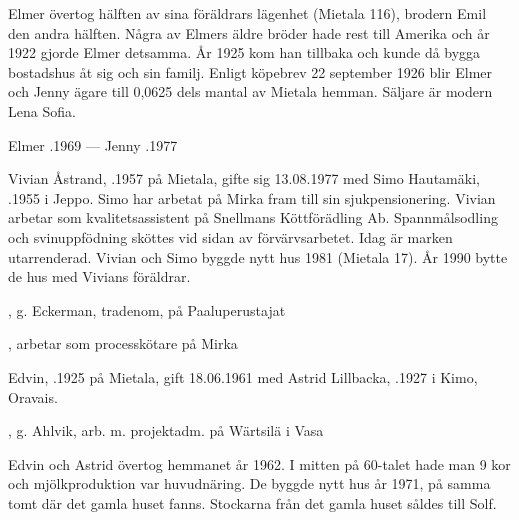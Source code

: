 Elmer övertog hälften av sina föräldrars lägenhet (Mietala 116), brodern Emil den andra hälften. Några av Elmers äldre bröder hade rest till  Amerika och år 1922 gjorde Elmer detsamma. År 1925 kom han tillbaka och kunde då bygga bostadshus åt sig och sin familj. Enligt köpebrev 22 september 1926 blir Elmer och Jenny ägare till 0,0625 dels mantal av Mietala hemman. Säljare är modern Lena Sofia.

Elmer .1969  ---  Jenny .1977



%



%
Vivian Åstrand, .1957 på Mietala, gifte sig 13.08.1977 med Simo Hautamäki, .1955 i Jeppo. Simo har arbetat på Mirka fram till sin sjukpensionering. Vivian arbetar som kvalitetsassistent på Snellmans Köttförädling Ab. Spannmålsodling och  svinuppfödning sköttes vid sidan av förvärvsarbetet. Idag är marken utarrenderad. Vivian och Simo byggde nytt hus 1981 (Mietala 17). År 1990 bytte de hus med Vivians föräldrar.
\begin{jhchildren}
  \item {}, g. Eckerman, tradenom, på Paaluperustajat
  \item {}, arbetar som processkötare på Mirka
\end{jhchildren}


%
Edvin, .1925 på Mietala, gift  18.06.1961 med Astrid Lillbacka, .1927 i Kimo, Oravais.
\begin{jhchildren}
  \item {}
  \item {}, g. Ahlvik, arb. m. projektadm. på Wärtsilä i Vasa
\end{jhchildren}

Edvin och Astrid övertog hemmanet år 1962. I mitten på 60-talet hade man 9 kor och mjölkproduktion var huvudnäring. De  byggde nytt hus år 1971, på samma tomt där det gamla huset fanns. Stockarna från det gamla huset såldes till Solf.

